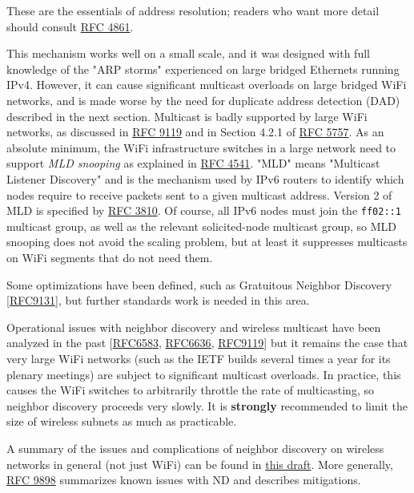 \documentclass[
]{article}
\begin{document}
These are the essentials of address resolution; readers who want more
detail should consult \href{https://www.rfc-editor.org/info/rfc4861}{RFC
4861}.

This mechanism works well on a small scale, and it was designed with
full knowledge of the "ARP storms" experienced on large bridged
Ethernets running IPv4. However, it can cause significant multicast
overloads on large bridged WiFi networks, and is made worse by the need
for duplicate address detection (DAD) described in the next section.
Multicast is badly supported by large WiFi networks, as discussed in
\href{https://www.rfc-editor.org/info/rfc9119}{RFC 9119} and in Section
4.2.1 of \href{https://www.rfc-editor.org/info/rfc5757}{RFC 5757}. As an
absolute minimum, the WiFi infrastructure switches in a large network
need to support \emph{MLD snooping} as explained in
\href{https://www.rfc-editor.org/info/rfc4541}{RFC 4541}. "MLD" means
"Multicast Listener Discovery" and is the mechanism used by IPv6 routers
to identify which nodes require to receive packets sent to a given
multicast address. Version 2 of MLD is specified by
\href{https://www.rfc-editor.org/info/rfc3810}{RFC 3810}. Of course, all
IPv6 nodes must join the \texttt{ff02::1} multicast group, as well as
the relevant solicited-node multicast group, so MLD snooping does not
avoid the scaling problem, but at least it suppresses multicasts on WiFi
segments that do not need them.

Some optimizations have been defined, such as Gratuitous Neighbor
Discovery {[}\href{https://www.rfc-editor.org/info/rfc9131}{RFC9131}{]},
but further standards work is needed in this area.

Operational issues with neighbor discovery and wireless multicast have
been analyzed in the past
{[}\href{https://www.rfc-editor.org/info/rfc6583}{RFC6583},
\href{https://www.rfc-editor.org/info/rfc6636}{RFC6636},
\href{https://www.rfc-editor.org/info/rfc9119}{RFC9119}{]} but it
remains the case that very large WiFi networks (such as the IETF builds
several times a year for its plenary meetings) are subject to
significant multicast overloads. In practice, this causes the WiFi
switches to arbitrarily throttle the rate of multicasting, so neighbor
discovery proceeds very slowly. It is \textbf{strongly} recommended to
limit the size of wireless subnets as much as practicable.

A summary of the issues and complications of neighbor discovery on
wireless networks in general (not just WiFi) can be found in
\href{https://datatracker.ietf.org/doc/draft-ietf-6man-ipv6-over-wireless/}{this
draft}. More generally,
\href{https://www.rfc-editor.org/info/rfc9898}{RFC 9898} summarizes
known issues with ND and describes mitigations.
\end{document}
